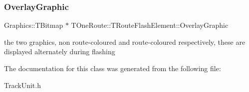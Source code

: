\subsubsection{\texorpdfstring{Overlay\+Graphic}{OverlayGraphic}}
{\footnotesize\ttfamily Graphics\+::\+T\+Bitmap $\ast$ T\+One\+Route\+::\+T\+Route\+Flash\+Element\+::\+Overlay\+Graphic}

the two graphics, non route-\/coloured and route-\/coloured respectively, these are displayed alternately during flashing 

The documentation for this class was generated from the following file\+:\begin{DoxyCompactItemize}
\item 
Track\+Unit.\+h\end{DoxyCompactItemize}
